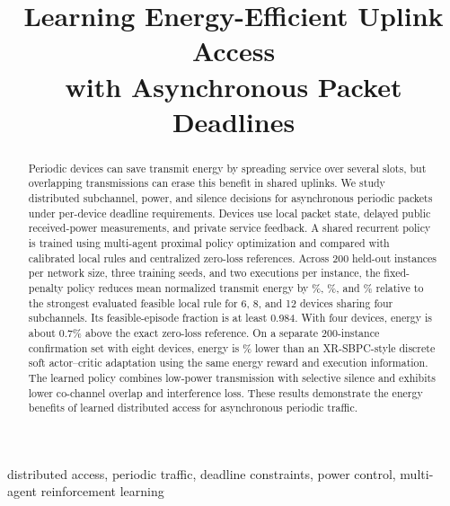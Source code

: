\documentclass[conference,10pt]{IEEEtran}
\title{Learning Energy-Efficient Uplink Access\\with Asynchronous Packet Deadlines}
\author{\IEEEauthorblockN{Author information to be supplied}}
\begin{document}
\maketitle
\begin{abstract}
Periodic devices can save transmit energy by spreading service over several
slots, but overlapping transmissions can erase this benefit in shared uplinks.
We study distributed subchannel, power, and silence decisions for asynchronous
periodic packets under per-device deadline requirements. Devices use local
packet state, delayed public received-power measurements, and private service
feedback. A shared recurrent policy is trained using multi-agent proximal
policy optimization and compared with calibrated local rules and centralized
zero-loss references. Across 200 held-out instances per network size, three
training seeds, and two executions per instance, the fixed-penalty policy
reduces mean normalized transmit energy by \SavingSix\%, \SavingEight\%,
and \SavingTwelve\% relative to the strongest evaluated feasible local rule
for 6, 8, and 12 devices sharing four subchannels. Its feasible-episode
fraction is at least 0.984. With four devices, energy is about 0.7\% above
the exact zero-loss reference. On a separate 200-instance confirmation set
with eight devices, energy is \ConfirmSavingSac\% lower than an XR-SBPC-style
discrete soft actor--critic adaptation using the same energy reward and
execution information. The learned policy combines low-power transmission
with selective silence and exhibits lower co-channel overlap and interference
loss. These results demonstrate the energy benefits of learned distributed
access for asynchronous periodic traffic.
\end{abstract}

\begin{IEEEkeywords}
distributed access, periodic traffic, deadline constraints, power control,
multi-agent reinforcement learning
\end{IEEEkeywords}










\end{document}
